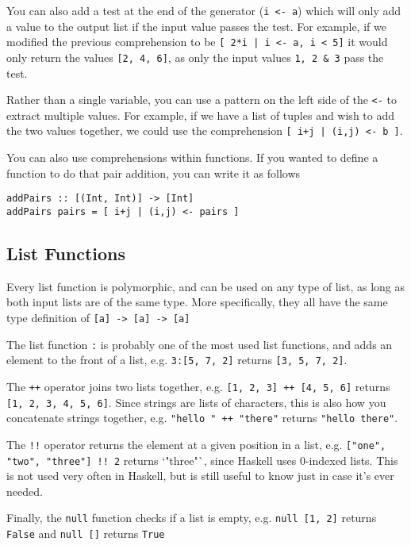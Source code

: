 You can also add a test at the end of the generator (\verb`i <- a`) which will only add a value to the output list if
 the input value passes the test. For example, if we modified the previous comprehension to be \verb`[ 2*i | i <- a, i < 5]`
 it would only return the values \verb`[2, 4, 6]`, as only the input values \verb`1, 2 & 3` pass the test.

Rather than a single variable, you can use a pattern on the left side of the \verb`<-` to extract multiple values. For
 example, if we have a list of tuples and wish to add the two values together, we could use the comprehension
 \verb`[ i+j | (i,j) <- b ]`.

You can also use comprehensions within functions. If you wanted to define a function to do that pair addition, you can
 write it as follows
\begin{verbatim}
addPairs :: [(Int, Int)] -> [Int]
addPairs pairs = [ i+j | (i,j) <- pairs ]
\end{verbatim}

\subsection*{List Functions}

Every list function is polymorphic, and can be used on any type of list, as long as both input lists are of the same
 type. More specifically, they all have the same type definition of \verb`[a] -> [a] -> [a]`

The list function \verb`:` is probably one of the most used list functions, and adds an element to the front of a list,
 e.g. \verb`3:[5, 7, 2]` returns \verb`[3, 5, 7, 2]`.

The \verb`++` operator joins two lists together, e.g. \verb`[1, 2, 3] ++ [4, 5, 6]` returns \verb`[1, 2, 3, 4, 5, 6]`.
 Since strings are lists of characters, this is also how you concatenate strings together, e.g. \verb`"hello " ++ "there"`
 returns \verb`"hello there"`.

The \verb`!!` operator returns the element at a given position in a list, e.g. \verb`["one", "two", "three"] !! 2`
 returns `"three"`, since Haskell uses 0-indexed lists. This is not used very often in Haskell, but is still useful to
 know just in case it's ever needed.

Finally, the \verb`null` function checks if a list is empty, e.g. \verb`null [1, 2]` returns \verb`False` and
 \verb`null []` returns \verb`True`